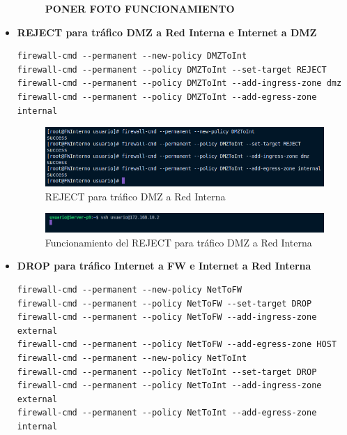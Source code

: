 \documentclass[11pt]{report}
\begin{document}
\begin{itemize}
  \begin{figure}[H]
    \centering \textbf{PONER FOTO FUNCIONAMIENTO }
  \end{figure}

  \item \textbf{REJECT para tráfico DMZ a Red Interna e Internet a DMZ}
  \begin{verbatim}
firewall-cmd --permanent --new-policy DMZToInt
firewall-cmd --permanent --policy DMZToInt --set-target REJECT
firewall-cmd --permanent --policy DMZToInt --add-ingress-zone dmz
firewall-cmd --permanent --policy DMZToInt --add-egress-zone internal
  \end{verbatim}
  \begin{figure}[H]
    \centering
    \includegraphics[scale=0.58]{img/reject_dmz_to_int.png}
    \caption{REJECT para tráfico DMZ a Red Interna}
    \label{fig:REJECT para tráfico DMZ a Red Interna}
  \end{figure}

  \begin{figure}[H]
    \centering
    \includegraphics[scale=0.49]{img/funcionamiento_reject.png}
    \caption{Funcionamiento del REJECT para tráfico DMZ a Red Interna}
  \end{figure}

  \cleardoublepage

  \item \textbf{DROP para tráfico Internet a FW e Internet a Red Interna}
  \begin{verbatim}
firewall-cmd --permanent --new-policy NetToFW
firewall-cmd --permanent --policy NetToFW --set-target DROP
firewall-cmd --permanent --policy NetToFW --add-ingress-zone external
firewall-cmd --permanent --policy NetToFW --add-egress-zone HOST
firewall-cmd --permanent --new-policy NetToInt
firewall-cmd --permanent --policy NetToInt --set-target DROP
firewall-cmd --permanent --policy NetToInt --add-ingress-zone external
firewall-cmd --permanent --policy NetToInt --add-egress-zone internal
  \end{verbatim}


\end{itemize}
\end{document}
